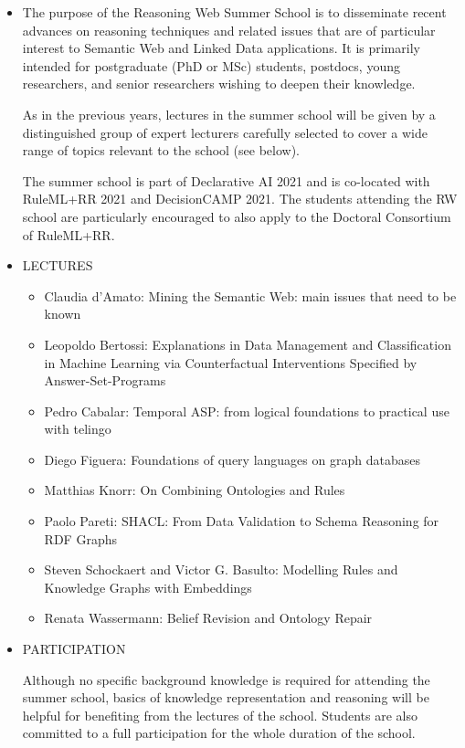\documentclass[prodmode,acmtecs]{acmsmall} %
\begin{document}
\begin{itemize}\item  The purpose of the Reasoning Web Summer School is to disseminate recent advances on reasoning techniques and related issues that are of particular interest to Semantic Web and Linked Data applications. It is primarily intended for postgraduate (PhD or MSc) students, postdocs, young researchers, and senior researchers wishing to deepen their knowledge. 
 
  As in the previous years, lectures in the summer school will be given by a distinguished group of expert lecturers carefully selected to cover a wide range of topics relevant to the school (see below). 
 
  The summer school is part of Declarative AI 2021 and is co-located with RuleML+RR 2021 and DecisionCAMP 2021. The students attending the RW school are particularly encouraged to also apply to the Doctoral Consortium of RuleML+RR. 
 
\item  LECTURES 
 
\begin{itemize}\item  Claudia d'Amato: Mining the Semantic Web: main issues that need to be known
\item  Leopoldo Bertossi: Explanations in Data Management and Classification in Machine Learning via Counterfactual Interventions Specified by Answer-Set-Programs
\item  Pedro Cabalar: Temporal ASP: from logical foundations to practical use with telingo
\item  Diego Figuera: Foundations of query languages on graph databases
\item  Matthias Knorr: On Combining Ontologies and Rules
\item  Paolo Pareti: SHACL: From Data Validation to Schema Reasoning for RDF Graphs
\item  Steven Schockaert and Victor G. Basulto: Modelling Rules and Knowledge Graphs with Embeddings
\item  Renata Wassermann: Belief Revision and Ontology Repair
\end{itemize} 
\item  PARTICIPATION  
 
  Although no specific background knowledge is required for attending the summer school, basics of knowledge representation and reasoning will be helpful for benefiting from the lectures of the school. Students are also committed to a full participation for the whole duration of the school. 
 

\end{itemize}
\end{document}
